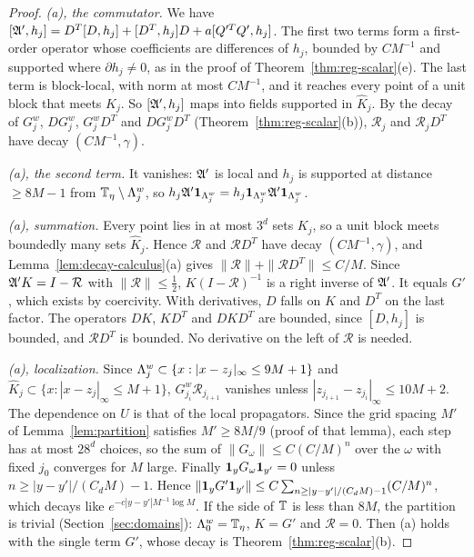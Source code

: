 \begin{proof}
\emph{(a), the commutator.} We have $[\mathfrak A',h_j]=D^T[D,h_j]+[D^T,h_j]D+a[Q'^TQ',h_j]$. The first two terms form a first-order operator whose coefficients are differences of $h_j$, bounded by $CM^{-1}$ and supported where $\partial h_j\ne0$, as in the proof of Theorem~\ref{thm:reg-scalar}(e). The last term is block-local, with norm at most $CM^{-1}$, and it reaches every point of a unit block that meets $K_j$. So $[\mathfrak A',h_j]$ maps into fields supported in $\hat K_j$. By the decay of $G^w_j$, $DG^w_j$, $G^w_jD^T$ and $DG^w_jD^T$ (Theorem~\ref{thm:reg-scalar}(b)), $\mathcal R_j$ and $\mathcal R_jD^T$ have decay $(CM^{-1},\gamma)$.

\emph{(a), the second term.} It vanishes: $\mathfrak A'$ is local and $h_j$ is supported at distance $\ge8M-1$ from $\mathbb T_\eta\setminus\Lambda^w_j$, so $h_j\mathfrak A'\mathbf 1_{\Lambda^w_j}=h_j\mathbf 1_{\Lambda^w_j}\mathfrak A'\mathbf 1_{\Lambda^w_j}$.

\emph{(a), summation.} Every point lies in at most $3^d$ sets $K_j$, so a unit block meets boundedly many sets $\hat K_j$. Hence $\mathcal R$ and $\mathcal RD^T$ have decay $(CM^{-1},\gamma)$, and Lemma~\ref{lem:decay-calculus}(a) gives $\|\mathcal R\|+\|\mathcal RD^T\|\le C/M$. Since $\mathfrak A'K=I-\mathcal R$ with $\|\mathcal R\|\le\frac12$, $K(I-\mathcal R)^{-1}$ is a right inverse of $\mathfrak A'$. It equals $G'$, which exists by coercivity. With derivatives, $D$ falls on $K$ and $D^T$ on the last factor. The operators $DK$, $KD^T$ and $DKD^T$ are bounded, since $[D,h_j]$ is bounded, and $\mathcal RD^T$ is bounded. No derivative on the left of $\mathcal R$ is needed.

\emph{(a), localization.} Since $\Lambda^w_j\subset\{x:|x-z_j|_\infty\le9M+1\}$ and $\hat K_j\subset\{x:|x-z_j|_\infty\le M+1\}$, $G^w_{j_i}\mathcal R_{j_{i+1}}$ vanishes unless $|z_{j_{i+1}}-z_{j_i}|_\infty\le10M+2$. The dependence on $U$ is that of the local propagators. Since the grid spacing $M'$ of Lemma~\ref{lem:partition} satisfies $M'\ge8M/9$ (proof of that lemma), each step has at most $28^d$ choices, so the sum of $\|G_\omega\|\le C(C/M)^n$ over the $\omega$ with fixed $j_0$ converges for $M$ large. Finally $\mathbf 1_yG_\omega\mathbf 1_{y'}=0$ unless $n\ge|y-y'|/(C_dM)-1$. Hence $\|\mathbf 1_yG'\mathbf 1_{y'}\|\le C\sum_{n\ge|y-y'|/(C_dM)-1}(C/M)^n$, which decays like $e^{-c|y-y'|M^{-1}\log M}$. If the side of $\mathbb T$ is less than $8M$, the partition is trivial (Section~\ref{sec:domains}): $\Lambda^w_0=\mathbb T_\eta$, $K=G'$ and $\mathcal R=0$. Then (a) holds with the single term $G'$, whose decay is Theorem~\ref{thm:reg-scalar}(b).


\end{proof}
